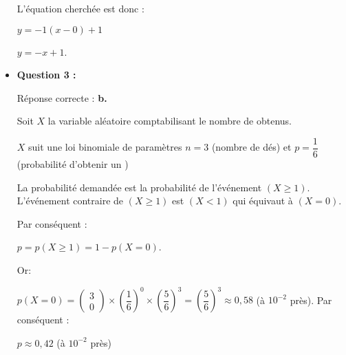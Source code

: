 \begin{corrige}
\begin{itemize}
          \par
          L'équation cherchée est donc :
          \par
          $y=- 1(x-0)+1$
          \par
          $y=- x+1$.
          \par
          \par
          \item \textbf{Question 3 :}
          \par
          Réponse correcte :\quad\textbf{ b.}
          \par
          Soit $X$ la variable aléatoire comptabilisant le nombre de  \fg{} obtenus.
          \par
          $X$ suit une loi binomiale de paramètres $n=3$ (nombre de dés) et $p=\dfrac{1}{6}$ (probabilité d'obtenir un  \fg{})
          \par
          La probabilité demandée est la probabilité de l'événement ${(X \geqslant 1)}$. L'événement contraire de ${(X \geqslant 1)}$ est ${(X < 1)}$ qui équivaut à ${(X = 0)}$.
          \par
          Par conséquent :
          \par
          $p=p(X \geqslant 1)=1 - p(X=0)$.
          \par
          Or:
          \par
          $p(X=0) = \begin{pmatrix} 3 \\ 0 \end{pmatrix} \times \left(\dfrac{1}{6}\right)^0 \times \left(\dfrac{5}{6}\right)^3$\nosp$ = \left(\dfrac{5}{6}\right)^3  \approx  0,58 $ (à $10^{-2}$ près).
          Par conséquent :
          \par
          $p \approx 0,42$ (à $10^{-2}$ près)
          \par
\end{itemize}
\end{corrige}
